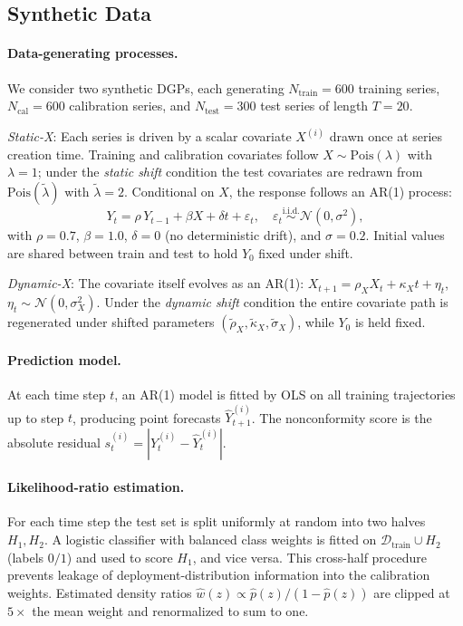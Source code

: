 \documentclass{article}
\numberwithin{equation}{section}
\begin{document}
\subsection{Synthetic Data}
\label{sec:experiments:synthetic}

\paragraph{Data-generating processes.}
We consider two synthetic DGPs, each generating $N_{\mathrm{train}} = 600$
training series, $N_{\mathrm{cal}} = 600$ calibration series, and
$N_{\mathrm{test}} = 300$ test series of length $T = 20$.

\textit{Static-X}: Each series is driven by a scalar covariate $X^{(i)}$
drawn once at series creation time.  Training and calibration covariates
follow $X \sim \mathrm{Pois}(\lambda)$ with $\lambda = 1$; under the
\emph{static shift} condition the test covariates are redrawn from
$\mathrm{Pois}(\tilde\lambda)$ with $\tilde\lambda = 2$.  Conditional on $X$,
the response follows an AR(1) process:
%
\[
  Y_t = \rho \, Y_{t-1} + \beta X + \delta t + \varepsilon_t, \quad
  \varepsilon_t \overset{\text{i.i.d.}}{\sim} \mathcal{N}(0, \sigma^2),
\]
%
with $\rho = 0.7$, $\beta = 1.0$, $\delta = 0$ (no deterministic drift), and
$\sigma = 0.2$.  Initial values are shared between train and test to hold
$Y_0$ fixed under shift.

\textit{Dynamic-X}: The covariate itself evolves as an AR(1):
$X_{t+1} = \rho_X X_t + \kappa_X t + \eta_t$, $\eta_t \sim \mathcal{N}(0,
\sigma_X^2)$.  Under the \emph{dynamic shift} condition the entire covariate
path is regenerated under shifted parameters $(\tilde\rho_X, \tilde\kappa_X,
\tilde\sigma_X)$, while $Y_0$ is held fixed.

\paragraph{Prediction model.}
At each time step $t$, an AR(1) model is fitted by OLS on all training
trajectories up to step $t$, producing point forecasts $\hat Y_{t+1}^{(i)}$.
The nonconformity score is the absolute residual
$s_t^{(i)} = |Y_t^{(i)} - \hat Y_t^{(i)}|$.

\paragraph{Likelihood-ratio estimation.}
For each time step the test set is split uniformly at random into two halves
$H_1, H_2$.  A logistic classifier with balanced class weights is fitted on
$\mathcal{D}_{\mathrm{train}} \cup H_2$ (labels $0/1$) and used to score
$H_1$, and vice versa.  This cross-half procedure prevents leakage of
deployment-distribution information into the calibration weights.
Estimated density ratios $\hat w(z) \propto \hat p(z) / (1 - \hat p(z))$ are
clipped at $5\times$ the mean weight and renormalized to sum to one.
\end{document}
